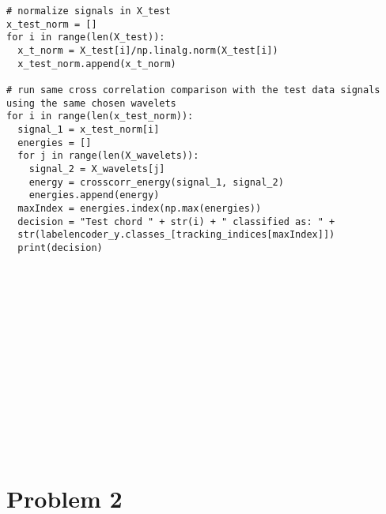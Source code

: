 \documentclass[letterpaper,twocolumn,10pt]{article}
\begin{document}
\begin{verbatim}
# normalize signals in X_test
x_test_norm = []
for i in range(len(X_test)):
  x_t_norm = X_test[i]/np.linalg.norm(X_test[i])
  x_test_norm.append(x_t_norm)
  
# run same cross correlation comparison with the test data signals using the same chosen wavelets
for i in range(len(x_test_norm)):
  signal_1 = x_test_norm[i]
  energies = []
  for j in range(len(X_wavelets)):
    signal_2 = X_wavelets[j]
    energy = crosscorr_energy(signal_1, signal_2)
    energies.append(energy)
  maxIndex = energies.index(np.max(energies))
  decision = "Test chord " + str(i) + " classified as: " + 
  str(labelencoder_y.classes_[tracking_indices[maxIndex]])
  print(decision)
  
  
  
  
  
  
  
  
  
  
  
  
  
  
  
\end{verbatim}

\section*{Problem 2}
\end{document}
